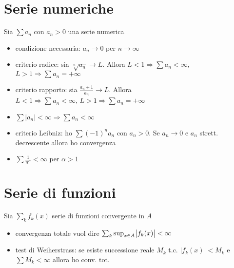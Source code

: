 \documentclass[a4paper,portrait,columns=3,5pt]{cheatsheet}
\begin{document}
\section{Serie numeriche}
Sia $\sum a_n$ con $a_n > 0$ una serie numerica
\begin{itemize}
    \item condizione necessaria: $a_n \rightarrow 0$ per $n \rightarrow \infty$
    \item criterio radice: sia $ \sqrt[n]{a_n} \rightarrow L$. Allora $L<1 \Rightarrow \sum a_n< \infty$, $L>1 \Rightarrow \sum a_n = + \infty$
    \item criterio rapporto: sia $\frac{a_n+1}{a_n} \rightarrow L$. Allora \\$L<1 \Rightarrow \sum a_n< \infty$, $L>1 \Rightarrow \sum a_n = + \infty$
    \item $\sum \left| a_n \right| < \infty \Rightarrow \sum a_n< \infty$
    \item criterio Leibniz: ho $\sum (-1)^n a_n$ con $a_n > 0$. Se $a_n \rightarrow 0$ e $a_n$ strett. decrescente allora ho convergenza
    \item $\sum \frac{1}{n^\alpha} < \infty$ per $\alpha > 1$
    
\end{itemize}

\section{Serie di funzioni}
Sia $\sum_k f_k(x)$ serie di funzioni convergente in $A$
\begin{itemize}
    \item convergenza totale vuol dire $\sum_k \sup_{x \in A} \abs{f_k(x)} < \infty$
    \item test di Weiherstrass: se esiste successione reale $M_k$ t.c. $\left|f_k(x)\right| < M_k$ e $\sum M_k < \infty$ allora ho conv. tot.
\end{itemize}
\end{document}
